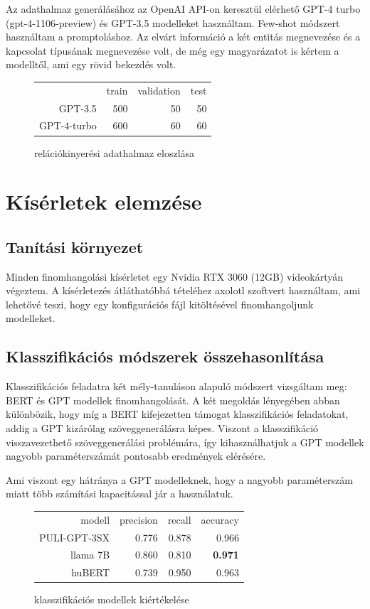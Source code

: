 Az adathalmaz generálásához az OpenAI API-on keresztül elérhető GPT-4 turbo (gpt-4-1106-preview) és GPT-3.5 modelleket használtam. Few-shot módszert használtam a promptoláshoz. Az elvárt információ a két entitás megnevezése és a kapcsolat típusának megnevezése volt, de még egy magyarázatot is kértem a modelltől, ami egy rövid bekezdés volt.

\begin{figure}[H]
	\centering
\begin{tabular}{rrrr}
	& train & validation & test \\
	GPT-3.5 & 500 & 50 & 50 \\
	GPT-4-turbo & 600 & 60 & 60 \\
\end{tabular}
\caption{relációkinyerési adathalmaz eloszlása}
\end{figure}

\section{Kísérletek elemzése}

\subsection{Tanítási környezet}

Minden finomhangolási kísérletet egy Nvidia RTX 3060 (12GB) videokártyán végeztem. A kísérletezés átláthatóbbá tételéhez axolotl szoftvert használtam, ami lehetővé teszi, hogy egy konfigurációs fájl kitöltésével finomhangoljunk modelleket.

\subsection{Klasszifikációs módszerek összehasonlítása}

Klasszifikációs feladatra két mély-tanuláson alapuló módszert vizsgáltam meg: BERT és GPT modellek finomhangolását. A két megoldás lényegében abban különbözik, hogy míg a BERT kifejezetten támogat klasszifikációs feladatokat, addig a GPT kizárólag szöveggenerálásra képes. Viszont a klasszifikáció visszavezethető szöveggenerálási problémára, így kihasználhatjuk a GPT modellek nagyobb paraméterszámát pontosabb eredmények elérésére.

Ami viszont egy hátránya a GPT modelleknek, hogy a nagyobb paraméterszám miatt több számítási kapacitással jár a használatuk.

\begin{figure}[H]
	\centering
	\begin{tabular}{rrrr}
		modell & precision & recall  & accuracy \\
		PULI-GPT-3SX & 0.776 & 0.878 & 0.966  \\
		llama 7B & 0.860 & 0.810 & \textbf{0.971} 	\\
		huBERT & 0.739 & 0.950 & 0.963 \\
	\end{tabular}
	\caption{klasszifikációs modellek kiértékelése}
\end{figure}

